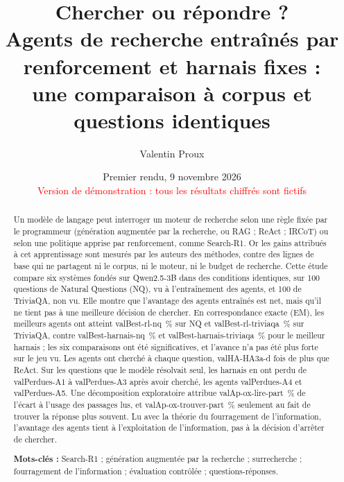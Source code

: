 \documentclass[11pt,a4paper]{article}
\title{Chercher ou répondre ?\\ Agents de recherche entraînés par renforcement et harnais fixes :\\ une comparaison à corpus et questions identiques}
\author{Valentin Proux}
\date{Premier rendu, 9 novembre 2026\iffictif\\[4pt]\textcolor{red}{\small Version de démonstration : tous les résultats chiffrés sont fictifs}\fi}
\newif\iffictif
\newcommand{\valHA}[2]{\csname valHA-#1-#2\endcsname}         %
\newcommand{\valPerdues}[1]{\csname valPerdues-#1\endcsname}   %
\newcommand{\valAp}[1]{\csname valAp-#1\endcsname}             %
\newcommand{\valBest}[2]{\csname valBest-#1-#2\endcsname}     %
\newcommand{\fictifnote}[1]{\iffictif\par\noindent\fcolorbox{red}{red!4}{\parbox{\dimexpr\linewidth-2\fboxsep-2\fboxrule}{\small\textcolor{red!70!black}{\textbf{Données fictives.} #1}}}\par\medskip\fi}
\begin{document}
\maketitle

\fictifnote{Les runs sur GPU n'ont pas encore été faits. Les chiffres des sections~\ref{sec:resultats} à~\ref{sec:conclusion} et du résumé viennent de données fabriquées par \texttt{analysis/donnees\_fictives.py} (paramètres choisis à la main, graine 2026), au format exact des vrais fichiers. Ils servent à tester la chaîne d'analyse et la mise en page ; ils ne disent rien des systèmes étudiés. Le texte qui les commente est un exemple de rédaction, à réécrire avec les vrais résultats.}

\begin{abstract}
\noindent Un modèle de langage peut interroger un moteur de recherche selon une règle fixée par le programmeur (génération augmentée par la recherche, ou RAG ; ReAct ; IRCoT) ou selon une politique apprise par renforcement, comme Search-R1. Or les gains attribués à cet apprentissage sont mesurés par les auteurs des méthodes, contre des lignes de base qui ne partagent ni le corpus, ni le moteur, ni le budget de recherche. Cette étude compare six systèmes fondés sur Qwen2.5-3B dans des conditions identiques, sur 100 questions de Natural Questions (NQ), vu à l'entraînement des agents, et 100 de TriviaQA, non vu. Elle montre que l'avantage des agents entraînés est net, mais qu'il ne tient pas à une meilleure décision de chercher. En correspondance exacte (EM), les meilleurs agents ont atteint \valBest{rl}{nq}~\% sur NQ et \valBest{rl}{triviaqa}~\% sur TriviaQA, contre \valBest{harnais}{nq}~\% et \valBest{harnais}{triviaqa}~\% pour le meilleur harnais ; les six comparaisons ont été significatives, et l'avance n'a pas été plus forte sur le jeu vu. Les agents ont cherché à chaque question, \valHA{HA3a}{d} fois de plus que ReAct. Sur les \valConnues{} questions que le modèle résolvait seul, les harnais en ont perdu de \valPerdues{A1} à \valPerdues{A3} après avoir cherché, les agents \valPerdues{A4} et \valPerdues{A5}. Une décomposition exploratoire attribue \valAp{ox-lire-part}~\% de l'écart à l'usage des passages lus, et \valAp{ox-trouver-part}~\% seulement au fait de trouver la réponse plus souvent. Lu avec la théorie du fourragement de l'information, l'avantage des agents tient à l'exploitation de l'information, pas à la décision d'arrêter de chercher.

\medskip
\noindent\textbf{Mots-clés :} Search-R1 ; génération augmentée par la recherche ; surrecherche ; fourragement de l'information ; évaluation contrôlée ; questions-réponses.
\end{abstract}
\end{document}

